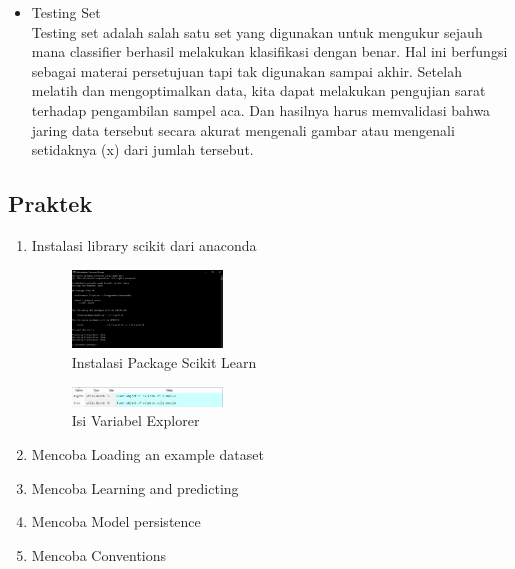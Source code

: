 \begin{enumerate}
\begin{itemize}
\item Testing Set\\
Testing set adalah salah satu set yang digunakan untuk mengukur sejauh mana classifier berhasil melakukan klasifikasi dengan benar. Hal ini berfungsi sebagai materai persetujuan tapi tak digunakan sampai akhir. Setelah melatih dan mengoptimalkan data, kita dapat melakukan pengujian sarat terhadap pengambilan sampel aca. Dan hasilnya harus memvalidasi bahwa jaring data tersebut secara akurat mengenali gambar atau mengenali setidaknya (x) dari jumlah tersebut.

\end{itemize}
\end{enumerate}

\subsection{Praktek}
\begin{enumerate}
\item Instalasi library scikit dari anaconda
\hfill\break
	\begin{figure}[H]
		\includegraphics[width=4cm]{figures/1174054/1/1.png}
		\centering
		\caption{Instalasi Package Scikit Learn}
	\end{figure}
	\begin{figure}[H]
		\includegraphics[width=4cm]{figures/1174054/1/2.png}
		\centering
		\caption{Isi Variabel Explorer}
	\end{figure}
\item Mencoba Loading an example dataset
\hfill\break
	
	
\item Mencoba Learning and predicting
\hfill\break
	
	
\item Mencoba Model persistence
\hfill\break
	
	
\item Mencoba Conventions
\hfill\break
	
\end{enumerate}

